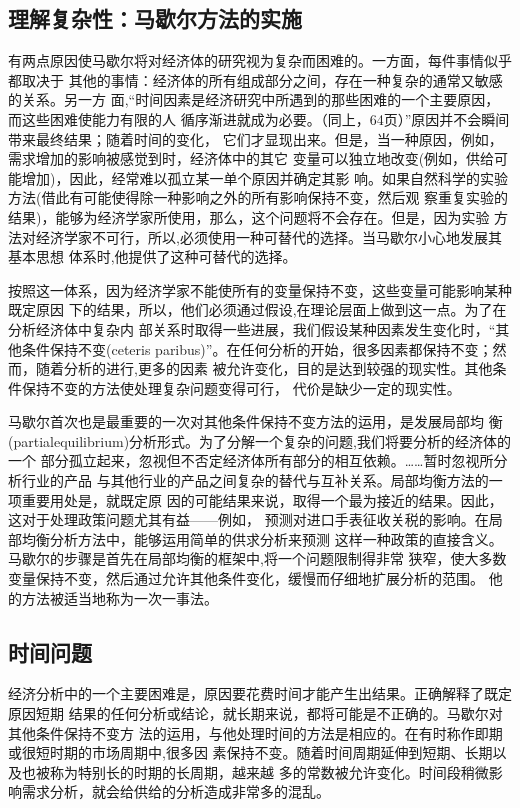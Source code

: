 \subsection{理解复杂性：马歇尔方法的实施}

有两点原因使马歇尔将对经济体的研究视为复杂而困难的。一方面，每件事情似乎都取决于
其他的事情：经济体的所有组成部分之间，存在一种复杂的通常又敏感的关系。另一方
面,“时间因素是经济研究中所遇到的那些困难的一个主要原因，而这些困难使能力有限的人
循序渐进就成为必要。（同上，64页）”原因并不会瞬间带来最终结果；随着时间的变化，
它们才显现出来。但是，当一种原因，例如，需求增加的影响被感觉到时，经济体中的其它
变量可以独立地改变(例如，供给可能增加)，因此，经常难以孤立某一单个原因并确定其影
响。如果自然科学的实验方法(借此有可能使得除一种影响之外的所有影响保持不变，然后观
察重复实验的结果)，能够为经济学家所使用，那么，这个问题将不会存在。但是，因为实验
方法对经济学家不可行，所以,必须使用一种可替代的选择。当马歇尔小心地发展其基本思想
体系时,他提供了这种可替代的选择。

按照这一体系，因为经济学家不能使所有的变量保持不变，这些变量可能影响某种既定原因
下的结果，所以，他们必须通过假设,在理论层面上做到这一点。为了在分析经济体中复杂内
部关系时取得一些进展，我们假设某种因素发生变化时，“其他条件保持不变(ceteris
paribus)”。在任何分析的开始，很多因素都保持不变；然而，随着分析的进行,更多的因素
被允许变化，目的是达到较强的现实性。其他条件保持不变的方法使处理复杂问题变得可行，
代价是缺少一定的现实性。

马歇尔首次也是最重要的一次对其他条件保持不变方法的运用，是发展局部均
衡(partialequilibrium)分析形式。为了分解一个复杂的问题,我们将要分析的经济体的一个
部分孤立起来，忽视但不否定经济体所有部分的相互依赖。……暂时忽视所分析行业的产品
与其他行业的产品之间复杂的替代与互补关系。局部均衡方法的一项重要用处是，就既定原
因的可能结果来说，取得一个最为接近的结果。因此，这对于处理政策问题尤其有益——例如，
预测对进口手表征收关税的影响。在局部均衡分析方法中，能够运用简单的供求分析来预测
这样一种政策的直接含义。马歇尔的步骤是首先在局部均衡的框架中,将一个问题限制得非常
狭窄，使大多数变量保持不变，然后通过允许其他条件变化，缓慢而仔细地扩展分析的范围。
他的方法被适当地称为一次一事法。

\subsection{时间问题}

经济分析中的一个主要困难是，原因要花费时间才能产生出结果。正确解释了既定原因短期
结果的任何分析或结论，就长期来说，都将可能是不正确的。马歇尔对其他条件保持不变方
法的运用，与他处理时间的方法是相应的。在有时称作即期或很短时期的市场周期中,很多因
素保持不变。随着时间周期延伸到短期、长期以及也被称为特别长的时期的长周期，越来越
多的常数被允许变化。时间段稍微影响需求分析，就会给供给的分析造成非常多的混乱。

